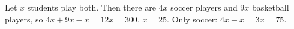 Let $x$ students play both. Then there are $4x$ soccer players and $9x$ basketball players, so $4x+9x-x=12x=300$, $x=25$. Only soccer: $4x-x=3x=\boxed{75}$.
